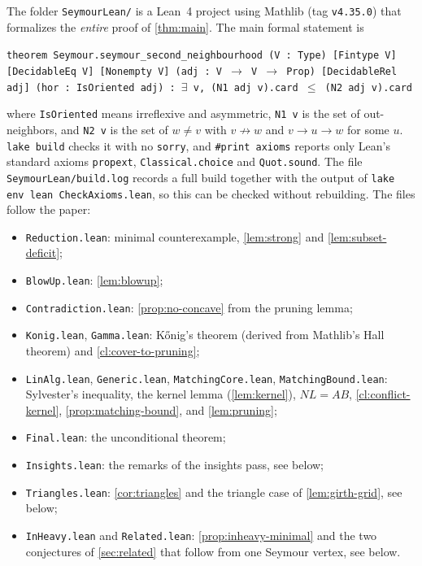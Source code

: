 The folder \texttt{SeymourLean/} is a Lean~4 project using Mathlib (tag
\texttt{v4.35.0}) that formalizes the \emph{entire} proof of
\cref{thm:main}. The main formal statement is
\begin{center}\small
\texttt{theorem Seymour.seymour\_second\_neighbourhood (V : Type) [Fintype V]
[DecidableEq V] [Nonempty V] (adj : V $\to$ V $\to$ Prop) [DecidableRel adj]
(hor : IsOriented adj) : $\exists$ v, (N1 adj v).card $\le$ (N2 adj v).card}
\end{center}
where \texttt{IsOriented} means irreflexive and asymmetric, \texttt{N1 v} is
the set of out-neighbors, and \texttt{N2 v} is the set of $w\ne v$ with
$v\not\to w$ and $v\to u\to w$ for some $u$. \texttt{lake build} checks it with
no \texttt{sorry}, and \texttt{\#print axioms} reports only Lean's standard
axioms \texttt{propext}, \texttt{Classical.choice} and \texttt{Quot.sound}.
The file \texttt{SeymourLean/build.log} records a full build together with
the output of \texttt{lake env lean CheckAxioms.lean}, so this can be checked
without rebuilding. The files follow the paper:
\begin{itemize}
\item \texttt{Reduction.lean}: minimal counterexample, \cref{lem:strong} and
\cref{lem:subset-deficit};
\item \texttt{BlowUp.lean}: \cref{lem:blowup};
\item \texttt{Contradiction.lean}: \cref{prop:no-concave} from the pruning lemma;
\item \texttt{Konig.lean}, \texttt{Gamma.lean}: K\H{o}nig's theorem (derived from
Mathlib's Hall theorem) and \cref{cl:cover-to-pruning};
\item \texttt{LinAlg.lean}, \texttt{Generic.lean}, \texttt{MatchingCore.lean},
\texttt{MatchingBound.lean}: Sylvester's inequality, the kernel lemma
(\cref{lem:kernel}), $NL=AB$, \cref{cl:conflict-kernel},
\cref{prop:matching-bound}, and \cref{lem:pruning};
\item \texttt{Final.lean}: the unconditional theorem;
\item \texttt{Insights.lean}: the remarks of the insights pass, see below;
\item \texttt{Triangles.lean}: \cref{cor:triangles} and the triangle case of
\cref{lem:girth-grid}, see below;
\item \texttt{InHeavy.lean} and \texttt{Related.lean}: \cref{prop:inheavy-minimal}
and the two conjectures of \cref{sec:related} that follow from one Seymour vertex,
see below.
\end{itemize}
